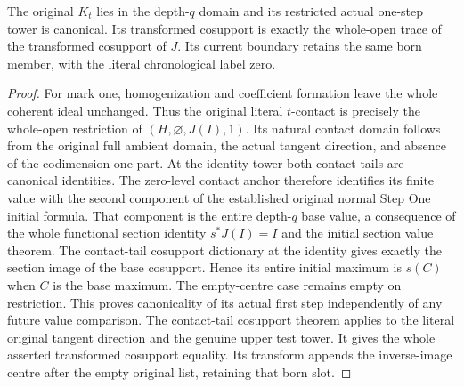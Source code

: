 \begin{lemma}
\label{hir:disjoint-first-step-literal-contact-canonical}
\leanok
The original $K_t$ lies in the depth-$q$ domain and its restricted actual
one-step tower is canonical. Its transformed cosupport is exactly the
whole-open trace of the transformed cosupport of $J$. Its current boundary
retains the same born member, with the literal chronological label zero.
\end{lemma}
\begin{proof}
For mark one, homogenization and coefficient formation leave the whole
coherent ideal unchanged. Thus the original literal $t$-contact is precisely
the whole-open restriction of $(H,\varnothing,J(I),1)$. Its natural contact
domain follows from the original full ambient domain, the actual tangent
direction, and absence of the codimension-one part. At the identity tower
both contact tails are canonical identities. The zero-level contact anchor
therefore identifies its finite value with the second component of the
established original normal Step One initial formula. That component is
the entire depth-$q$ base value, a consequence of the whole functional section
identity $s^*J(I)=I$ and the initial section value theorem. The contact-tail
cosupport dictionary at the identity gives exactly the section image of the
base cosupport. Hence its entire initial maximum is $s(C)$ when $C$ is the base
maximum. The empty-centre case remains empty on restriction. This proves
canonicality of its actual first step independently of any future value
comparison. The contact-tail cosupport theorem applies to the literal
original tangent direction and the genuine upper test tower. It gives the
whole asserted transformed cosupport equality. Its transform appends the
inverse-image centre after the empty original list, retaining that born slot.
\end{proof}

